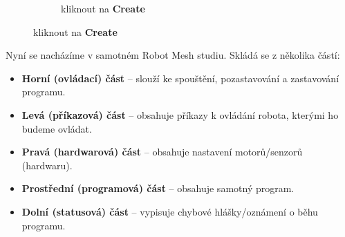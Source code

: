 \documentclass[../main.tex]{subfiles}
\begin{document}
\begin{figure}[h!]
		\begin{subfigure}{.3\textwidth}%
			\centering%
			\caption{kliknout na \textbf{Create}}%
		\end{subfigure}%
	\end{figure}

	\newpage

	Nyní se nacházíme v samotném Robot Mesh studiu. Skládá se z několika částí:

	\begin{itemize}
		\item \textbf{Horní (ovládací) část} -- slouží ke spouštění, pozastavování a zastavování programu.
		\item \textbf{Levá (příkazová) část} -- obsahuje příkazy k ovládání robota, kterými ho budeme ovládat.
		\item \textbf{Pravá (hardwarová) část} -- obsahuje nastavení motorů/senzorů (hardwaru).
		\item \textbf{Prostřední (programová) část} -- obsahuje samotný program.
		\item \textbf{Dolní (statusová) část} -- vypisuje chybové hlášky/oznámení o běhu programu.
	\end{itemize}

	\begin{figure}[h!]
		\centering
	\end{figure}
\end{document}

